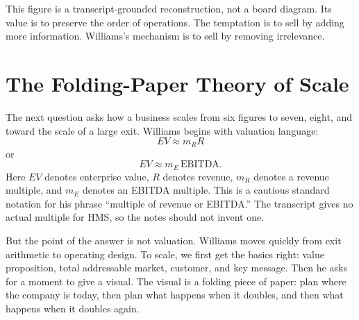 \begin{figure}
\centering
{}
\end{figure}

This figure is a transcript-grounded reconstruction, not a board diagram. Its value is to preserve the order of operations. The temptation is to sell by adding more information. Williams's mechanism is to sell by removing irrelevance.

\section{The Folding-Paper Theory of Scale}

The next question asks how a business scales from six figures to seven, eight, and toward the scale of a large exit. Williams begins with valuation language:
\begin{equation}
EV \approx m_R R
\end{equation}
or
\begin{equation}
EV \approx m_E\,\mathrm{EBITDA}.
\end{equation}
Here \(EV\) denotes enterprise value, \(R\) denotes revenue, \(m_R\) denotes a revenue multiple, and \(m_E\) denotes an EBITDA multiple. This is a cautious standard notation for his phrase ``multiple of revenue or EBITDA.'' The transcript gives no actual multiple for HMS, so the notes should not invent one.

But the point of the answer is not valuation. Williams moves quickly from exit arithmetic to operating design. To scale, we first get the basics right: value proposition, total addressable market, customer, and key message. Then he asks for a moment to give a visual. The visual is a folding piece of paper: plan where the company is today, then plan what happens when it doubles, and then what happens when it doubles again.


